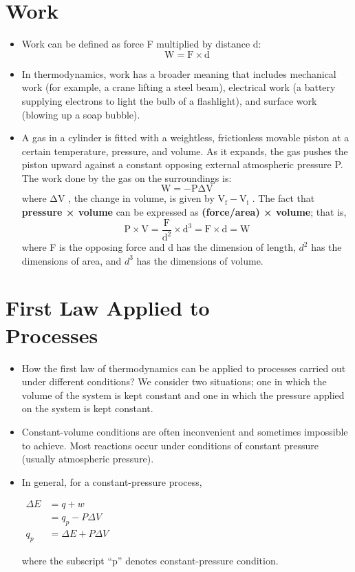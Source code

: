 \documentclass[a4paper,12pt,twocolumn]{article}
\begin{document}
\section{Work}
\begin{itemize}
\item Work can be defined as force F multiplied by distance d: 
$$\mathrm{W = F \times d}$$
\item In thermodynamics, work has a broader meaning that includes mechanical work (for example, a crane lifting a steel beam), electrical work (a battery supplying electrons to light the bulb of a flashlight), and surface work (blowing up a soap bubble).
\item A gas in a cylinder is fitted with a weightless, frictionless movable piston at a certain temperature, pressure, and volume. As it expands, the gas pushes the piston upward against a constant opposing external atmospheric pressure P. The work done by the gas on the surroundings is:
$$\mathrm{W = - P\Delta V}$$
where $\mathrm{\Delta V}$ , the change in volume, is given by $\mathrm{V_f - V_i}$ . 
The fact that \textbf{pressure × volume} can be expressed as \textbf{(force/area) × volume}; that is,
$$\mathrm{P \times V = \dfrac{F}{d^2} \times d^3 = F \times d = W}$$
where F is the opposing force and d has the dimension of length, $d^2$ has the dimensions of area, and $d^3$ has the dimensions of volume.
\end{itemize}

\section{First Law Applied to \\ Processes}
\begin{itemize}
\item How the first law of thermodynamics can be applied to processes carried out under different conditions?  We consider two situations; one in which the volume of the system is kept constant and one in which the pressure applied on the system is kept constant. 
\item Constant-volume conditions are often inconvenient and sometimes impossible to achieve. Most reactions occur under conditions of constant pressure (usually atmospheric pressure). 
\item In general, for a constant-pressure process,
\begin{center}
$\begin{aligned}
\Delta E & = q + w \\
& = q_p - P\Delta V \\ 
q_p & = \Delta E + P\Delta V
\end{aligned}$
\end{center}
where the subscript “p” denotes constant-pressure condition.
\end{itemize}
\end{document}

